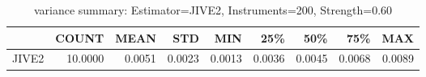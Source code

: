 \begin{table}[ht]
\centering
\caption{variance summary: Estimator=JIVE2, Instruments=200, Strength=0.60}
\begin{tabular}{lrrrrrrrr}
\toprule
 & COUNT & MEAN & STD & MIN & 25\% & 50\% & 75\% & MAX \\
\midrule
JIVE2 & 10.0000 & 0.0051 & 0.0023 & 0.0013 & 0.0036 & 0.0045 & 0.0068 & 0.0089 \\
\bottomrule
\end{tabular}
\end{table}
